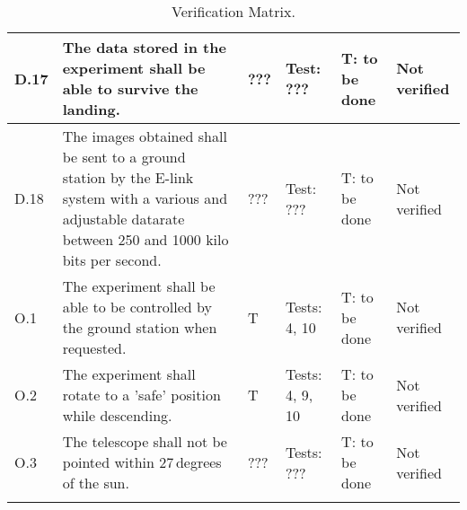 \begin{longtable}[]{|m{}| m{}|m{}|m{}|m{}|m{}|}
\rowcolor{yellow} D.17 & The data stored in the experiment shall be able to survive the landing.
& ??? & Test: ??? & T: to be done & Not verified \\\hline

\rowcolor{yellow} D.18 & The images obtained shall be sent to a ground station by the E-link system with a various and adjustable datarate between 250 and 1000 kilo bits per second.
& ??? & Test: ??? & T: to be done & Not verified \\\hline




O.1 & The experiment shall be able to be controlled by the ground station when requested.
& T & Tests: 4, 10 & T: to be done & Not verified \\\hline

O.2 & The experiment shall rotate to a 'safe' position while descending.
& T & Tests: 4, 9, 10 & T: to be done & Not verified \\\hline

\rowcolor{yellow} O.3 & The telescope shall not be pointed within 27\,degrees of the sun.
& ??? & Tests: ??? & T: to be done & Not verified \\\hline

\caption{Verification Matrix.}
\label{tab:var-mat}
\end{longtable}
\raggedbottom